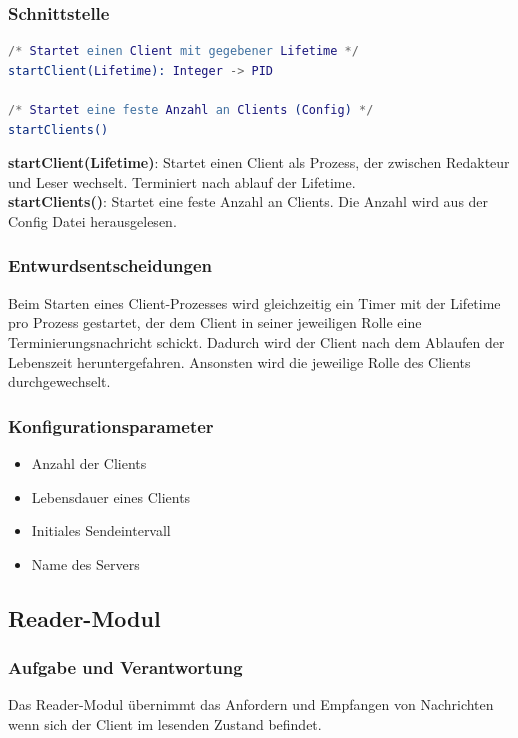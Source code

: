 \documentclass{article}
\begin{document}
\subsubsection{Schnittstelle}
\begin{lstlisting}[language=erlang]
/* Startet einen Client mit gegebener Lifetime */
startClient(Lifetime): Integer -> PID

/* Startet eine feste Anzahl an Clients (Config) */
startClients()
\end{lstlisting}

\textbf{startClient(Lifetime)}: Startet einen Client als Prozess, der zwischen Redakteur und Leser wechselt. Terminiert
nach ablauf der Lifetime.\\

\textbf{startClients()}: Startet eine feste Anzahl an Clients. Die Anzahl wird aus der Config Datei herausgelesen.

\subsubsection{Entwurdsentscheidungen}
Beim Starten eines Client-Prozesses wird gleichzeitig ein Timer mit der Lifetime pro Prozess gestartet, der dem Client
in seiner jeweiligen Rolle eine Terminierungsnachricht schickt. Dadurch wird der Client nach dem Ablaufen der Lebenszeit
heruntergefahren. Ansonsten wird die jeweilige Rolle des Clients durchgewechselt.

\subsubsection{Konfigurationsparameter}
\begin{itemize}
    \item Anzahl der Clients
    \item Lebensdauer eines Clients
    \item Initiales Sendeintervall
    \item Name des Servers
\end{itemize}

\subsection{Reader-Modul}
\subsubsection{Aufgabe und Verantwortung}
Das Reader-Modul übernimmt das Anfordern und Empfangen von Nachrichten wenn sich der Client
im lesenden Zustand befindet.
\end{document}

